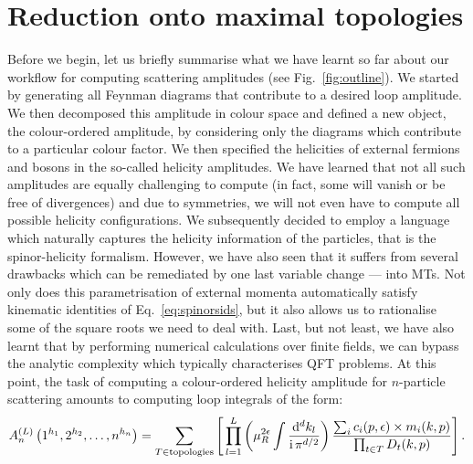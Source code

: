 \documentclass[main.tex]{subfiles}
\begin{document}
\section{Reduction onto maximal topologies} \label{sec:reduction}
Before we begin, let us briefly summarise what we have learnt so far about our workflow for computing scattering amplitudes (see Fig.~\ref{fig:outline}). We started by generating all Feynman diagrams that contribute to a desired loop amplitude. We then decomposed this amplitude in colour space and defined a new object, the colour-ordered amplitude, by considering only the diagrams which contribute to a particular colour factor. We then specified the helicities of external fermions and bosons in the so-called helicity amplitudes. We have learned that not all such amplitudes are equally challenging to compute (in fact, some will vanish or be free of divergences) and due to symmetries, we will not even have to compute all possible helicity configurations. We subsequently decided to employ a language which naturally captures the helicity information of the particles, that is the spinor-helicity formalism. However, we have also seen that it suffers from several drawbacks which can be remediated by one last variable change --- into MTs. Not only does this parametrisation of external momenta automatically satisfy kinematic identities of Eq.~\ref{eq:spinorsids}, but it also allows us to rationalise some of the square roots we need to deal with. Last, but not least, we have also learnt that by performing numerical calculations over finite fields, we can bypass the analytic complexity which typically characterises QFT problems.
At this point, the task of computing a colour-ordered helicity amplitude for $n$-particle scattering amounts to computing loop integrals of the form:
\begin{equation} \label{eq:ampschematic}
    	A_n^{(L)} \left(1^{h_1}, 2^{h_2}, \ldots, n^{h_n} \right) =  \sum_{T\in \text{topologies}} \left[\, \prod_{l=1}^{L} \left(\mu_R^{2\epsilon} \int \frac{\mathrm{d}^d k_l}{\mathrm{i} \, \pi^{d/2}}\right) \frac{\sum_i c_i(p, \epsilon )\times m_i(k,p)}{\prod_{t\in T} D_t(k,p)} \right].
\end{equation}
\end{document}
